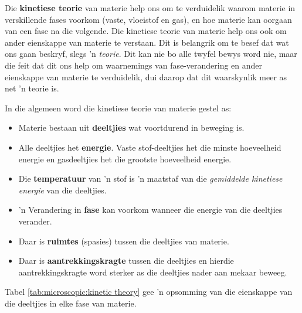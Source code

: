       \label{m38730*id308618}Die \textbf{kinetiese teorie} van materie help ons om te verduidelik waarom materie in verskillende fases voorkom (vaste, vloeistof en gas), en hoe materie kan oorgaan van een fase na die volgende. Die kinetiese teorie van materie help ons ook om ander eienskappe van materie te verstaan. Dit is belangrik om te besef dat wat ons gaan beskryf, slegs  'n \textsl{teorie}. Dit kan nie bo alle twyfel bewys word nie, maar die feit dat dit ons help om waarnemings van fase-verandering en ander eienskappe van materie te verduidelik, dui daarop dat dit waarskynlik meer as net  'n teorie is.
\par 
      \label{m38730*id308641}In die algemeen word die kinetiese teorie van materie gestel as:
\par 
      \label{m38730*id308647}\begin{itemize}[noitemsep]
            \label{m38730*uid34}\item Materie bestaan uit \textbf{deeltjies} wat voortdurend in beweging is.
\label{m38730*uid35}\item Alle deeltjies het \textbf{energie}. Vaste stof-deeltjies het die minste hoeveelheid energie en gasdeeltjies
het die grootste hoeveelheid energie.
\label{m38730*uid36}\item Die \textbf{temperatuur} van  'n stof is  'n maatstaf  van die \textsl{gemiddelde kinetiese energie} van die deeltjies.
\label{m38730*uid37}\item  'n Verandering in \textbf{fase} kan voorkom wanneer die energie van die deeltjies verander.
\label{m38730*uid38}\item Daar is \textbf{ruimtes} (spasies) tussen die deeltjies van materie.
\label{m38730*uid39}\item Daar is \textbf{aantrekkingskragte} tussen die deeltjies en hierdie aantrekkingskragte word sterker as die deeltjies nader aan mekaar beweeg.
\end{itemize}
      \label{m38730*id308767}Tabel \ref{tab:microscopic:kinetic theory} gee  'n opsomming van die eienskappe van die deeltjies in elke fase van materie.\par 
